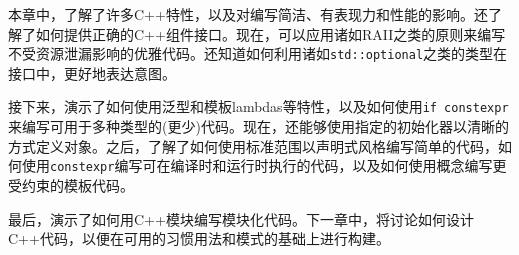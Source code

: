 本章中，了解了许多C++特性，以及对编写简洁、有表现力和性能的影响。还了解了如何提供正确的C++组件接口。现在，可以应用诸如RAII之类的原则来编写不受资源泄漏影响的优雅代码。还知道如何利用诸如\texttt{std::optional}之类的类型在接口中，更好地表达意图。

接下来，演示了如何使用泛型和模板lambdas等特性，以及如何使用\texttt{if constexpr}来编写可用于多种类型的(更少)代码。现在，还能够使用指定的初始化器以清晰的方式定义对象。之后，了解了如何使用标准范围以声明式风格编写简单的代码，如何使用\texttt{constexpr}编写可在编译时和运行时执行的代码，以及如何使用概念编写更受约束的模板代码。

最后，演示了如何用C++模块编写模块化代码。下一章中，将讨论如何设计C++代码，以便在可用的习惯用法和模式的基础上进行构建。